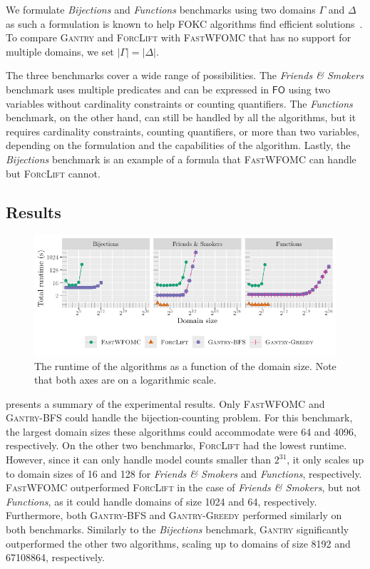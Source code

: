 \documentclass[a4paper,UKenglish,cleveref, autoref, thm-restate]{lipics-v2021}
\newcommand{\FO}{$\mathsf{FO}$}
\newcommand{\Cranetwo}{\textsc{Gantry}}
\newcommand{\Cranebfs}{\textsc{Gantry-BFS}}
\newcommand{\Cranegreedy}{\textsc{Gantry-Greedy}}
\newcommand{\friends}{\emph{Friends \& Smokers}}
\newcommand{\functions}{\emph{Functions}}
\newcommand{\bijections}{\emph{Bijections}}
\begin{document}
\begin{remark*}
  We formulate \bijections{} and \functions{} benchmarks using two domains
  $\Gamma$ and $\Delta$ as such a formulation is known to help FOKC algorithms
  find efficient solutions~\cite{DBLP:conf/kr/DilkasB23}. To compare \Cranetwo{}
  and \textsc{ForcLift} with \textsc{FastWFOMC} that has no support for multiple
  domains, we set $|\Gamma| = |\Delta|$.
\end{remark*}

The three benchmarks cover a wide range of possibilities. The \friends{}
benchmark uses multiple predicates and can be expressed in \FO{} using two
variables without cardinality constraints or counting quantifiers. The
\functions{} benchmark, on the other hand, can still be handled by all the
algorithms, but it requires cardinality constraints, counting quantifiers, or
more than two variables, depending on the formulation and the capabilities of
the algorithm. Lastly, the \bijections{} benchmark is an example of a formula
that \textsc{FastWFOMC} can handle but \textsc{ForcLift} cannot.

\subsection{Results}

\begin{figure}[t]
  \centering
  \includegraphics{plot.pdf}
  \caption{The runtime of the algorithms as a function of the domain size. Note
    that both axes are on a logarithmic scale.}\label{fig:plot}
\end{figure}

 presents a summary of the experimental results. Only
\textsc{FastWFOMC} and \Cranebfs{} could handle the bijection-counting problem.
For this benchmark, the largest domain sizes these algorithms could accommodate
were \num{64} and \num{4096}, respectively. On the other two benchmarks,
\textsc{ForcLift} had the lowest runtime. However, since it can only handle
model counts smaller than $2^{31}$, it only scales up to domain sizes of
\num{16} and \num{128} for \friends{} and \functions{}, respectively.
\textsc{FastWFOMC} outperformed \textsc{ForcLift} in the case of \friends{}, but
not \functions{}, as it could handle domains of size \num{1024} and \num{64},
respectively. Furthermore, both \Cranebfs{} and \Cranegreedy{} performed
similarly on both benchmarks. Similarly to the \bijections{} benchmark,
\Cranetwo{} significantly outperformed the other two algorithms, scaling up to
domains of size \num{8192} and \num{67108864}, respectively.
\end{document}
